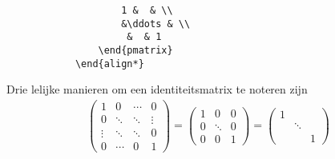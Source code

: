 \documentclass{article}
\newenvironment{demobox}{
    \begin{adjustbox}{frame=1pt 10pt}%
        \begin{minipage}{\linewidth-22pt}
}{
        \end{minipage}
    \end{adjustbox}
}
\begin{document}
\begin{enumerate}
\begin{verbatim}
                    1 &  & \\
                    &\ddots & \\
                     &  & 1
                \end{pmatrix}
            \end{align*}
        \end{verbatim}
        \begin{demobox}
            Drie lelijke manieren om een identiteitsmatrix te noteren zijn
            \begin{align*}
                \begin{pmatrix}
                    1 & 0 & \cdots & 0\\
                    0 & \ddots & \ddots & \vdots\\
                    \vdots & \ddots & \ddots & 0\\
                    0 & \cdots & 0 & 1
                \end{pmatrix}
                = \begin{pmatrix}
                    1 & 0 & 0\\
                    0 &\ddots & 0\\
                    0 & 0 & 1
                \end{pmatrix}
                = \begin{pmatrix}
                    1 &  & \\
                    &\ddots & \\
                     &  & 1
                \end{pmatrix}
            \end{align*}
        \end{demobox}
    \end{enumerate}
\end{document}
